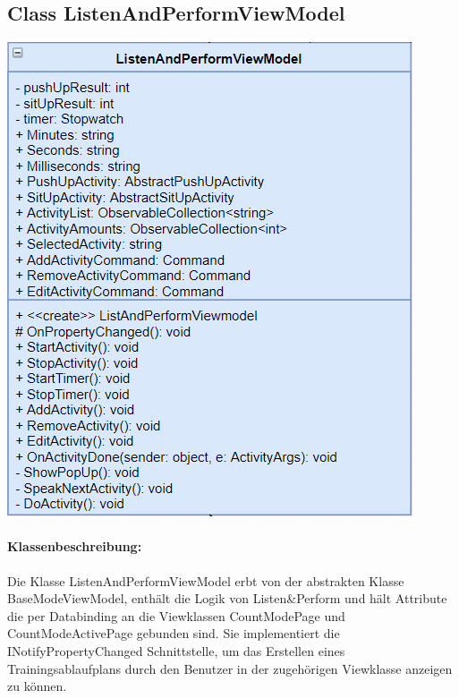 \documentclass[a4paper,12pt]{article}
\begin{document}
	\subsection{Class ListenAndPerformViewModel}

	\includegraphics{bilder/ViewModelKlassen/ListenAndPerformViewModel}

\paragraph{Klassenbeschreibung:}
Die Klasse ListenAndPerformViewModel erbt von der abstrakten Klasse BaseModeViewModel, enthält die Logik von Listen\&Perform und hält Attribute die per Databinding an die Viewklassen CountModePage und CountModeActivePage gebunden sind.  Sie implementiert die INotifyPropertyChanged Schnittstelle, um das Erstellen eines Trainingsablaufplans durch den Benutzer in der zugehörigen Viewklasse anzeigen zu können.
\end{document}
